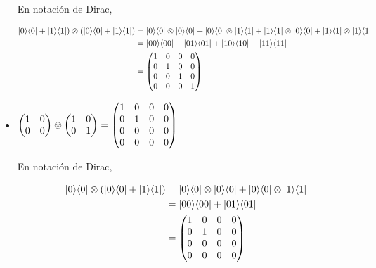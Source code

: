 \documentclass[osajnl,preprint,showpacs,superscriptaddress,10pt]{revtex4-1} %
\DeclarePairedDelimiter\bra{\langle}{\rvert}
\DeclarePairedDelimiter\ket{\lvert}{\rangle}
\begin{document}
\begin{itemize}
    En notación de Dirac,
    \begin{fleqn}[\parindent]
    \begin{equation}
    \begin{split}
        \ket{0} \bra{0} + \ket{1} \bra{1}) \tens (\ket{0} \bra{0} + \ket{1} \bra{1})
        &= \ket{0} \bra{0} \tens \ket{0} \bra{0} + \ket{0} \bra{0} \tens \ket{1} \bra{1} + \ket{1} \bra{1} \tens \ket{0} \bra{0} + \ket{1} \bra{1} \tens \ket{1} \bra{1} \\
        &= \ket{00} \bra{00} + \ket{01} \bra{01} + \ket{10} \bra{10} + \ket{11} \bra{11} \\
        &= \begin{pmatrix}
            1 & 0 & 0 & 0 \\
            0 & 1 & 0 & 0 \\
            0 & 0 & 1 & 0 \\
            0 & 0 & 0 & 1
        \end{pmatrix}
    \end{split}
    \end{equation}
    \end{fleqn}
    
    \item $\begin{pmatrix}
        1 & 0 \\
        0 & 0
    \end{pmatrix}
    \tens 
    \begin{pmatrix}
        1  & 0 \\
        0 & 1
    \end{pmatrix} =
    \begin{pmatrix}
        1 & 0 & 0 & 0 \\
        0 & 1 & 0 & 0 \\
        0 & 0 & 0 & 0 \\
        0 & 0 & 0 & 0
    \end{pmatrix}$
    
    En notación de Dirac,
    \begin{fleqn}[\parindent]
    \begin{equation}
    \begin{split}
        \ket{0} \bra{0} \tens (\ket{0} \bra{0} + \ket{1} \bra{1})
        &= \ket{0} \bra{0} \tens \ket{0} \bra{0} + \ket{0} \bra{0} \tens \ket{1} \bra{1} \\
        &= \ket{00} \bra{00} + \ket{01} \bra{01} \\
        &= \begin{pmatrix}
            1 & 0 & 0 & 0 \\
            0 & 1 & 0 & 0 \\
            0 & 0 & 0 & 0 \\
            0 & 0 & 0 & 0
        \end{pmatrix}
    \end{split}
    \end{equation}
    \end{fleqn}
    

\end{itemize}
\end{document}
